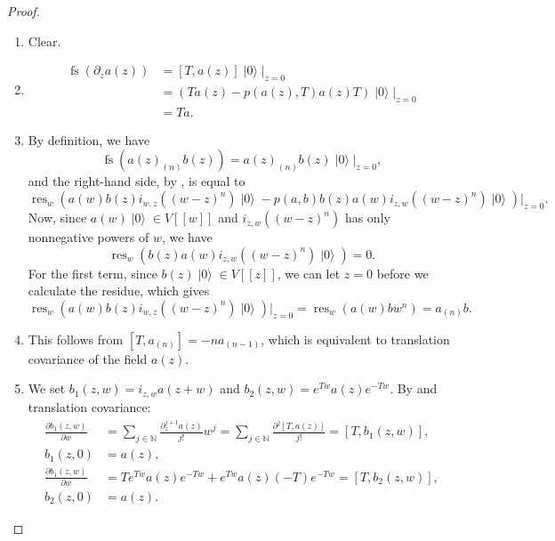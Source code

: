 \documentclass[a4paper, 12pt, reqno]{amsart}
\theoremstyle{remark}
\DeclareMathOperator{\res}{res}
\DeclareMathOperator{\vac}{|0\rangle}
\DeclareMathOperator{\fs}{fs}
\begin{document}
\begin{proof}\leavevmode
  \begin{enumerate}
  \item Clear.
  \item
    \begin{align*}
      \fs(\partial_za(z)) &= [T, a(z)]\vac|_{z = 0} \\
                          &= (Ta(z) - p(a(z), T)a(z)T)\vac|_{z = 0} \\
                          &= Ta.
    \end{align*}
  \item By definition, we have
    \begin{equation*}
      \fs(a(z)_{(n)}b(z)) = a(z)_{(n)}b(z)\vac|_{z = 0},
    \end{equation*}
    and the right-hand side, by , is equal to
    \begin{equation*}
      \res_w(a(w)b(z)i_{w, z}((w - z)^n)\vac - p(a, b)b(z)a(w)i_{z, w}((w - z)^n)\vac)|_{z = 0}.
    \end{equation*}
    Now, since $a(w)\vac \in V[[w]]$ and $i_{z, w}((w - z)^n)$ has only nonnegative powers of $w$, we have
    \begin{equation*}
      \res_w(b(z)a(w)i_{z, w}((w - z)^n)\vac) = 0.
    \end{equation*}
    For the first term, since $b(z)\vac \in V[[z]]$, we can let $z = 0$ before we calculate the residue, which gives
    \begin{equation*}
      \res_w(a(w)b(z)i_{w, z}((w - z)^n)\vac)|_{z = 0} = \res_w(a(w)bw^n) = a_{(n)}b.
    \end{equation*}
  \item This follows from $[T, a_{(n)}] = -na_{(n - 1)}$, which is equivalent to translation covariance of the field $a(z)$.
  \item We set $b_1(z, w) = i_{z, w}a(z + w)$ and $b_2(z, w) = e^{Tw}a(z)e^{-Tw}$.
    By  and translation covariance:
    \begin{align*}
      \frac{\partial b_1(z, w)}{\partial w} &= \sum_{j \in \mathbb{N}}\frac{\partial^{j + 1}_za(z)}{j!}w^j = \sum_{j \in \mathbb{N}}\frac{\partial^j[T, a(z)]}{j!} = [T, b_1(z, w)], \\
      b_1(z, 0) &= a(z), \\
      \frac{\partial b_1(z, w)}{\partial w} &= Te^{Tw}a(z)e^{-Tw} + e^{Tw}a(z)(-T)e^{-Tw} = [T, b_2(z, w)], \\
      b_2(z, 0) &= a(z).
    \end{align*}

\end{enumerate}
\end{proof}
\end{document}
